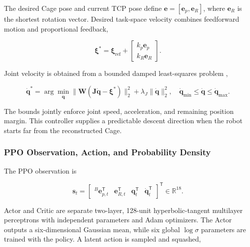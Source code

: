 \documentclass[conference]{IEEEtran}
\begin{document}
The desired Cage pose and current TCP pose define \(\mathbf{e}=[\mathbf{e}_p,\mathbf{e}_R]\), where \(\mathbf{e}_R\) is the shortest rotation vector. Desired task-space velocity combines feedforward motion and proportional feedback,

\begin{equation}
\boldsymbol{\xi}^{*}=\boldsymbol{\xi}_{\mathrm{ref}}+
\begin{bmatrix}k_p\mathbf{e}_p\\k_R\mathbf{e}_R\end{bmatrix}.

\end{equation}

Joint velocity is obtained from a bounded damped least-squares problem \cite{ref10},

\begin{equation}
\dot{\mathbf{q}}^{*}=\arg\min_{\dot{\mathbf{q}}}
\|\mathbf{W}(\mathbf{J}\dot{\mathbf{q}}-\boldsymbol{\xi}^{*})\|_2^2
+\lambda_J\|\dot{\mathbf{q}}\|_2^2,
\quad
\dot{\mathbf{q}}_{\min}\leq\dot{\mathbf{q}}\leq\dot{\mathbf{q}}_{\max}.

\end{equation}

The bounds jointly enforce joint speed, acceleration, and remaining position margin. This controller supplies a predictable descent direction when the robot starts far from the reconstructed Cage.

\subsubsection{PPO Observation, Action, and Probability Density}

The PPO observation is

\begin{equation}
\mathbf{s}_t=
\begin{bmatrix}
{}^{B}\mathbf{e}_{p,t}^{\mathsf T}&
\mathbf{e}_{R,t}^{\mathsf T}&
\mathbf{q}_t^{\mathsf T}&
\dot{\mathbf{q}}_t^{\mathsf T}
\end{bmatrix}^{\mathsf T}\in\mathbb{R}^{18}.

\end{equation}

Actor and Critic are separate two-layer, 128-unit hyperbolic-tangent multilayer perceptrons with independent parameters and Adam optimizers. The Actor outputs a six-dimensional Gaussian mean, while six global \(\log\sigma\) parameters are trained with the policy. A latent action is sampled and squashed,
\end{document}
